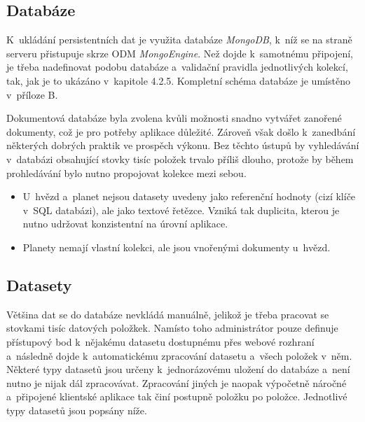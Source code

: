 \documentclass[a4paper,12pt]{article}
\begin{document}
{{{{{{{{


\subsection{Databáze}

K~ukládání persistentních dat je využita databáze \textit{MongoDB}, k~níž se na straně serveru přistupuje skrze ODM \textit{MongoEngine}. Než dojde k~samotnému připojení, je třeba nadefinovat podobu databáze a~validační pravidla jednotlivých kolekcí, tak, jak je to ukázáno v~kapitole 4.2.5. Kompletní schéma databáze je umístěno v~příloze B.



Dokumentová databáze byla zvolena kvůli možnosti snadno vytvářet zanořené dokumenty, což je pro potřeby aplikace důležité. Zároveň však došlo k~zanedbání některých dobrých praktik ve prospěch výkonu. Bez těchto ústupů by vyhledávání v~databázi obsahující stovky tisíc položek trvalo příliš dlouho, protože by během prohledávání bylo nutno propojovat kolekce mezi sebou.

\begin{itemize}
	\item U~hvězd a~planet nejsou datasety uvedeny jako referenční hodnoty (cizí klíče v~SQL databázi), ale jako textové řetězce. Vzniká tak duplicita, kterou je nutno udržovat konzistentní na úrovní aplikace.
	\item Planety nemají vlastní kolekci, ale jsou vnořenými dokumenty u~hvězd.
\end{itemize}

\subsection{Datasety}

Většina dat se do databáze nevkládá manuálně, jelikož je třeba pracovat se stovkami tisíc datových položkek. Namísto toho administrátor pouze definuje přístupový bod k~nějakému datasetu dostupnému přes webové rozhraní a~následně dojde k~automatickému zpracování datasetu a~všech položek v~něm. Některé typy datasetů jsou určeny k~jednorázovému uložení do databáze a~není nutno je nijak dál zpracovávat. Zpracování jiných je naopak výpočetně náročné a~připojené klientské aplikace tak činí postupně položku po položce. Jednotlivé typy datasetů jsou popsány níže.

}}}}}}}}
\end{document}
